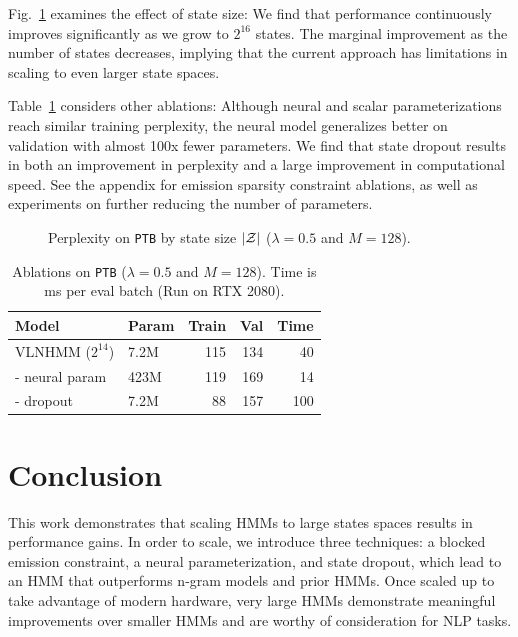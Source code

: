 \documentclass[11pt,a4paper]{article}
\begin{document}
Fig.~\ref{tbl:states-ablation} examines the effect of state size:
We find that performance continuously improves significantly as we grow to $2^{16}$ states.
The marginal improvement as the number of states decreases, implying that the current approach has limitations in scaling to even larger state spaces.

Table~\ref{tbl:dropout-param-ablation} considers other ablations:
Although neural and scalar parameterizations reach similar training perplexity,
the neural model generalizes better on validation
with almost 100x fewer parameters.
We find that state dropout results in both an improvement in perplexity and
a large improvement in computational speed.
See the appendix for emission sparsity constraint ablations,
as well as experiments on further reducing the number of parameters.

\begin{figure}[!t]
\centering
{}
\caption{\label{tbl:states-ablation}
Perplexity on \texttt{PTB} by state size $|\mathcal{Z}|$ ($\lambda =0.5$ and $M=128$).
}
\end{figure}


\begin{table}[!t]
\centering
\begin{tabular}{llrrr}
\toprule
Model                & Param & Train  & Val  &  Time \\
\midrule
VLNHMM ($2^{14}$)    & 7.2M & 115    & 134  & 40\\
\quad - neural param & 423M & 119    & 169  & 14\\
\quad - dropout      & 7.2M & 88     & 157  & 100\\
\bottomrule
\end{tabular}
\caption{\label{tbl:dropout-param-ablation}
Ablations on \texttt{PTB} ($\lambda =0.5$ and $M=128$). 
Time is ms per eval batch (Run on RTX 2080).
}
\end{table}


\section{Conclusion}
This work demonstrates that scaling HMMs to large states spaces results in performance gains.
In order to scale, we introduce three techniques:
a blocked emission constraint, a neural parameterization,
and state dropout, which lead to an HMM that outperforms n-gram models and prior HMMs.
Once scaled up to take advantage of modern hardware,
very large HMMs demonstrate meaningful improvements over smaller HMMs
and are worthy of consideration for NLP tasks. 
\end{document}
